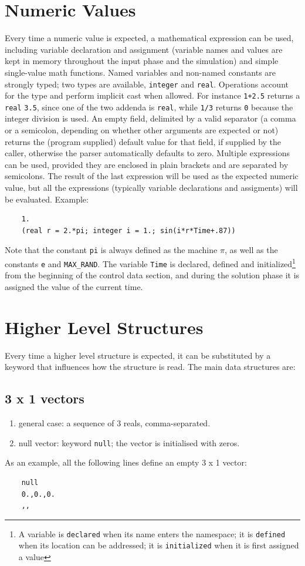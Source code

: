 \documentclass[10pt,dvips]{report}
\begin{document}
\section{Numeric Values}
Every time a numeric value is expected, a mathematical expression
can be used, including variable declaration and assignment (variable names
and values are kept in memory throughout the input phase and the
simulation) and simple single-value math functions.
Named variables and non-named constants are strongly typed; two types are
available, {\tt integer} and {\tt real}.
Operations account for the type and perform implicit cast when allowed.
For instance {\tt 1+2.5} returns a {\tt real} {\tt 3.5}, since one of the 
two addenda is {\tt real}, while {\tt 1/3} returns {\tt 0} because 
the integer division is used.
An empty field, delimited by a valid separator (a comma or a semicolon,
depending on whether other arguments are expected or not) returns the
(program supplied) default value for that field, if supplied by the caller, 
otherwise the parser automatically defaults to zero.
Multiple expressions can be used, provided they are enclosed in plain 
brackets and are separated by semicolons.
The result of the last expression will be used as the expected numeric value,
but all the expressions (typically variable declarations and assigments) 
will be evaluated.
Example:
\begin{verbatim}
    1.
    (real r = 2.*pi; integer i = 1.; sin(i*r*Time+.87))      
\end{verbatim}
Note that the constant {\tt pi} is always defined
as the machine $ \pi $, as well as the constants {\tt e} and 
{\tt MAX\_RAND}.
The variable {\tt Time} is declared, defined and initialized\footnote{
    A variable is {\tt declared} when its name enters the namespace;
    it is {\tt defined} when its location can be addressed;
    it is {\tt initialized} when it is first assigned a value
} from the beginning of the control data section, and during the solution 
phase it is assigned the value of the current time. 

\section{Higher Level Structures}
Every time a higher level structure is expected, it can be
substituted by a keyword that influences how the structure is read.
The main data structures are:
\subsection{3 x 1 vectors}
\begin{enumerate}
    \item general case: a sequence of 3 reals, comma-separated.
    \item null vector: keyword {\tt null}; the vector is initialised
    with zeros.
\end{enumerate}
As an example, all the following lines define an empty 3 x 1 vector:
\begin{verbatim}
    null
    0.,0.,0.
    ,,
\end{verbatim} 
\end{document}
